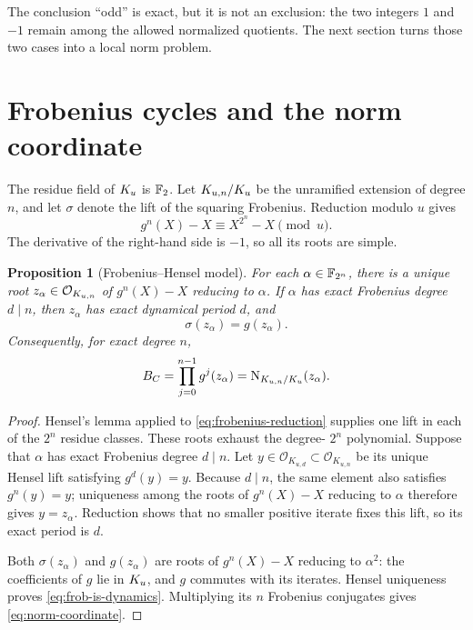 \documentclass[11pt]{article}
\newtheorem{proposition}[theorem]{Proposition}
\theoremstyle{definition}
\theoremstyle{remark}
\begin{document}
The conclusion ``odd'' is exact, but it is not an exclusion: the two
integers \(1\) and \(-1\) remain among the allowed normalized quotients.
The next section turns those two cases into a local norm problem.

\section{Frobenius cycles and the norm coordinate}
\label{sec:norm}

The residue field of \(K_u\) is \(\mathbb{F}_2\).  Let \(K_{u,n}/K_u\) be the
unramified extension of degree \(n\), and let \(\sigma\) denote the lift of
the squaring Frobenius.  Reduction modulo \(u\) gives
\begin{equation}
  g^n(X)-X\equiv X^{2^n}-X\pmod u.
  \label{eq:frobenius-reduction}
\end{equation}
The derivative of the right-hand side is \(-1\), so all its roots are
simple.

\begin{proposition}[Frobenius--Hensel model]
\label{prop:hensel}
For each \(\alpha\in\mathbb{F}_{2^n}\), there is a unique root
\(z_\alpha\in\mathcal O_{K_{u,n}}\) of \(g^n(X)-X\) reducing to
\(\alpha\).  If \(\alpha\) has exact Frobenius degree \(d\mid n\), then
\(z_\alpha\) has exact dynamical period \(d\), and
\begin{equation}
  \sigma(z_\alpha)=g(z_\alpha).
  \label{eq:frob-is-dynamics}
\end{equation}
Consequently, for exact degree \(n\),
\begin{equation}
  B_C=\prod_{j=0}^{n-1}g^j(z_\alpha)
      =\operatorname{N}_{K_{u,n}/K_u}(z_\alpha).
  \label{eq:norm-coordinate}
\end{equation}
\end{proposition}

\begin{proof}
Hensel's lemma applied to \eqref{eq:frobenius-reduction} supplies one lift in
each of the \(2^n\) residue classes.  These roots exhaust the degree-
\(2^n\) polynomial.  Suppose that \(\alpha\) has exact Frobenius degree
\(d\mid n\).  Let \(y\in\mathcal O_{K_{u,d}}\subset\mathcal O_{K_{u,n}}\)
be its unique Hensel lift satisfying \(g^d(y)=y\).  Because \(d\mid n\), the
same element also satisfies \(g^n(y)=y\); uniqueness among the roots of
\(g^n(X)-X\) reducing to \(\alpha\) therefore gives \(y=z_\alpha\).
Reduction shows that no smaller positive iterate fixes this lift, so its exact
period is \(d\).

Both \(\sigma(z_\alpha)\) and \(g(z_\alpha)\) are roots of
\(g^n(X)-X\) reducing to \(\alpha^2\): the coefficients of \(g\) lie in
\(K_u\), and \(g\) commutes with its iterates.  Hensel uniqueness proves
\eqref{eq:frob-is-dynamics}.  Multiplying its \(n\) Frobenius conjugates
gives \eqref{eq:norm-coordinate}.
\end{proof}
\end{document}

